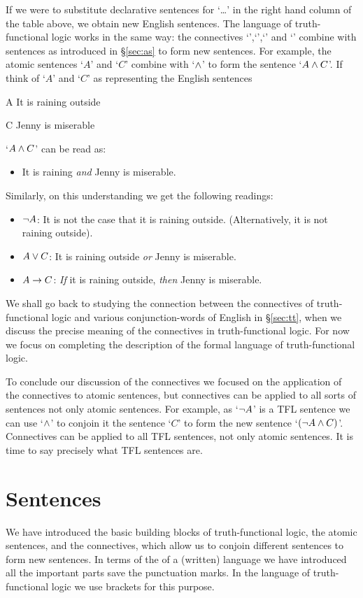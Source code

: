 If we were to substitute declarative sentences for `\dots' in the right hand column of the table above, we obtain new English sentences. The language of truth-functional logic works in the same way: the connectives `\enot',`\eand',`\eor' and `\eif' combine with sentences as introduced in \S\ref{sec:as} to form new sentences. For example, the atomic sentences `$A$' and `$C$' combine
with `$\mathbin{\wedge}$' to form the sentence `$A\mathbin{\wedge} C$'. If think of `$A$' and `$C$' as representing the English sentences
\begin{ekey}
		\item[A] It is raining outside
		\item[C] Jenny is miserable
	\end{ekey}
`$A\mathbin{\wedge} C$' can be read as:
\begin{itemize}
\item It is raining \emph{and} Jenny is miserable.
\end{itemize}
Similarly, on this understanding we get the following readings:
\begin{itemize}
\item $\neg A$: It is not the case that it is raining outside. (Alternatively, it is not raining outside).
\item $A\vee C$: It is raining outside \emph{or} Jenny is miserable.
\item $A\rightarrow C$: \emph{If} it is raining outside, \emph{then} Jenny is miserable.
 \end{itemize}
 We shall go back to studying the connection between the connectives of truth-functional logic and various conjunction-words of English in \S\ref{sec:tt}, when we discuss the precise meaning of the connectives in truth-functional logic. For now we focus on completing the description of the formal language of truth-functional logic.

 To conclude our discussion of the connectives we focused on the application of the connectives to atomic sentences, but connectives can be applied to all sorts of sentences not only atomic sentences. For example, as `$\neg A$' is a TFL sentence we can use `$\mathbin{\wedge}$' to conjoin it the sentence `$C$' to form the new sentence `$(\neg A\mathbin{\wedge} C)$'. Connectives can be applied to all TFL sentences, not only atomic sentences. It is time to say precisely what TFL sentences are.

\section{Sentences}\label{s:TFLSentences}
We have introduced the basic building blocks of truth-functional logic, the atomic sentences, and the connectives, which allow us to conjoin different sentences to form new sentences. In terms of the  of a (written) language we have introduced all the important parts save the punctuation marks. In the language of truth-functional logic we use brackets for this purpose.

